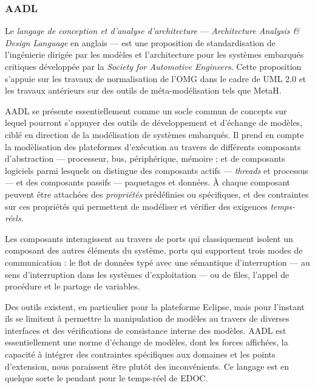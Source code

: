 \subsubsection{AADL}

Le \emph{langage de conception et d'analyse d'architecture}\cite{aadl-overview} ---
\emph{Architecture Analysis \& Design Language} en anglais --- est une
proposition de standardisation de l'ing\'enierie dirig\'ee par les
mod\`eles et l'architecture pour les syst\`emes embarqu\'es
critiques d\'evelopp\'ee par la \emph{Society for  Automotive
  Engineers}. Cette proposition s'appuie sur les travaux de
normalisation de l'OMG dans le cadre de \textsf{UML 2.0} et les
travaux ant\'erieurs sur des outils de m\'eta-mod\'elisation tels
que \textsf{MetaH}.

\textsf{AADL} se pr\'esente essentiellement comme un socle commun de
concepts sur lequel pourront s'appuyer des outils de d\'eveloppement
et d'\'echange de mod\`eles, cibl\'e en direction de la
mod\'elisation de syst\`emes embarqu\'es. Il prend en compte 
la mod\`elisation des plateformes d'ex\'ecution au travers de
diff\'erents composants d'abstraction --- processeur, bus,
p\'eriph\'erique, m\'emoire ; et de composants logiciels parmi
lesquels on distingue des composants actifs --- \emph{threads}  et
processus --- et des composants passifs --- paquetages et donn\'ees.
\`A chaque composant peuvent \^etre attach\'ees des
\emph{propri\'et\'es} pr\'ed\'efinies ou sp\'ecifiques, et des
contraintes sur ces propri\'et\'es qui permettent de mod\'eliser et
v\'erifier des exigences \emph{temps-r\'eels}.

Les composants interagissent au travers de ports qui classiquement
isolent un composant des autres \'el\'ements du syst\`eme, ports
qui supportent trois modes de communication : le flot de donn\'ees
typ\'e avec une s\'emantique d'interruption --- au sens
d'interruption dans les syst\`emes d'exploitation --- ou de files, l'appel
de proc\'edure et le partage de variables.

Des outils existent, en particulier pour la plateforme
\textsf{Eclipse}, mais pour l'instant ils se limitent \`a
permettre la manipulation de mod\`eles au travers de diverses
interfaces  et des
v\'erifications de consistance interne des mod\`eles. \textsf{AADL} est
essentiellement une norme d'\'echange de mod\`eles, dont les forces
affich\'ees, la capacit\'e \`a int\'egrer des contraintes sp\'ecifiques aux
domaines et les points d'extension, nous paraissent \^etre
plut\^ot des inconv\'enients. Ce langage est en quelque sorte le
pendant pour le temps-r\'eel de \textsf{EDOC}. 

